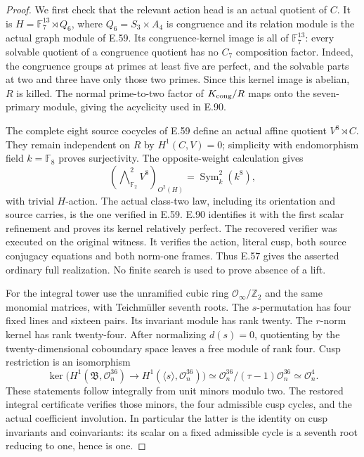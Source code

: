 \begin{proof}
We first check that the relevant action head is an actual quotient
of \(C\).  It is \(H=\mathbb F_7^{13}\rtimes Q_6\), where
\(Q_6=S_3\times A_4\) is congruence and its relation module is
the actual graph module of E.59.  Its congruence-kernel image
is all of \(\mathbb F_7^{13}\): every solvable quotient of a
congruence quotient has no \(C_7\) composition factor.
Indeed, the congruence groups
at primes at least five are perfect, and the solvable parts
at two and three have only those two primes.
Since this kernel image is abelian, \(R\) is killed.
The normal prime-to-two factor of \(K_{\rm cong}/R\)
maps onto the seven-primary module, giving the acyclicity
used in E.90.

The complete eight source cocycles of E.59 define an actual
affine quotient \(V^8\rtimes C\).
They remain independent on \(R\) by \(H^1(C,V)=0\);
simplicity with endomorphism field \(k=\mathbb F_8\) proves
surjectivity.  The opposite-weight calculation gives
\[
 (\bigwedge\nolimits^2_{\mathbb F_2}V^8)_{O^2(H)}
       =\operatorname{Sym}^2_k(k^8),
                                                        \tag{E.91.2}
\]
with trivial \(H\)-action.  The actual class-two law, including
its orientation and source carries, is the one verified in E.59.
E.90 identifies it with the first scalar refinement and proves
its kernel relatively perfect.  The recovered verifier
was executed on the original witness.  It verifies the action,
literal cusp, both source conjugacy equations and both norm-one
frames.  Thus E.57 gives the asserted ordinary full realization.
No finite search is used to prove absence of a lift.

For the integral tower use the unramified cubic ring
\(\mathcal O_\infty/\mathbb Z_2\) and the same monomial matrices,
with Teichm\"uller seventh roots.  The \(s\)-permutation has
four fixed lines and sixteen pairs.  Its invariant module has
rank twenty.  The \(r\)-norm kernel has rank twenty-four.
After normalizing \(d(s)=0\), quotienting by the
twenty-dimensional coboundary space leaves a free module of
rank four.  Cusp restriction is an isomorphism
\[
 \ker\bigl(H^1(\mathfrak B,\mathcal O_n^{36})
              \to H^1(\langle s\rangle,\mathcal O_n^{36})\bigr)
       \simeq \mathcal O_n^{36}/(\tau-1)\mathcal O_n^{36}
       \simeq\mathcal O_n^4.                             \tag{E.91.3}
\]
These statements follow integrally from unit minors modulo two.
The restored integral certificate verifies those minors,
the four admissible cusp cycles, and the actual coefficient
involution.  In particular the latter is the identity on cusp
invariants and coinvariants: its scalar on a fixed admissible
cycle is a seventh root reducing to one, hence is one.


\end{proof}
